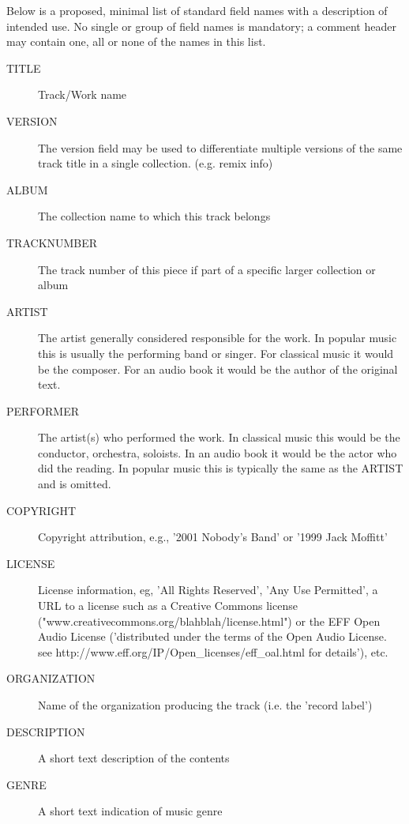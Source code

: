 Below is a proposed, minimal list of standard field names with a
description of intended use.  No single or group of field names is
mandatory; a comment header may contain one, all or none of the names
in this list.

\begin{description} %
\item[TITLE]
	Track/Work name

\item[VERSION]
	The version field may be used to differentiate multiple
versions of the same track title in a single collection. (e.g. remix
info)

\item[ALBUM]
	The collection name to which this track belongs

\item[TRACKNUMBER]
	The track number of this piece if part of a specific larger collection or album

\item[ARTIST]
	The artist generally considered responsible for the work. In popular music this is usually the performing band or singer. For classical music it would be the composer. For an audio book it would be the author of the original text.

\item[PERFORMER]
	The artist(s) who performed the work. In classical music this would be the conductor, orchestra, soloists. In an audio book it would be the actor who did the reading. In popular music this is typically the same as the ARTIST and is omitted.

\item[COPYRIGHT]
	Copyright attribution, e.g., '2001 Nobody's Band' or '1999 Jack Moffitt'

\item[LICENSE]
	License information, eg, 'All Rights Reserved', 'Any
Use Permitted', a URL to a license such as a Creative Commons license
("www.creativecommons.org/blahblah/license.html") or the EFF Open
Audio License ('distributed under the terms of the Open Audio
License. see http://www.eff.org/IP/Open_licenses/eff_oal.html for
details'), etc.

\item[ORGANIZATION]
	Name of the organization producing the track (i.e.
the 'record label')

\item[DESCRIPTION]
	A short text description of the contents

\item[GENRE]
	A short text indication of music genre


\end{description}
